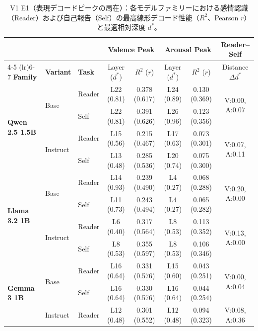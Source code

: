 \begin{table}[htbp]
\centering
\small
\caption{V1 E1（表現デコードピークの局在）：各モデルファミリーにおける感情認識（Reader）および自己報告（Self）の最高線形デコード性能（$R^2$、Pearson $r$）と最適相対深度 $d^*$。}
\label{tab:v1_peak_decodability}
\begin{tabular}{lll cccc c}
\toprule
 & & & \multicolumn{2}{c}{\textbf{Valence Peak}} & \multicolumn{2}{c}{\textbf{Arousal Peak}} & \textbf{Reader--Self} \\
\cmidrule(lr){4-5} \cmidrule(lr){6-7}
\textbf{Family} & \textbf{Variant} & \textbf{Task} & Layer ($d^*$) & $R^2$ ($r$) & Layer ($d^*$) & $R^2$ ($r$) & Distance $\Delta d^*$ \\
\midrule
\multirow{4}{*}{\textbf{Qwen 2.5 1.5B}} & \multirow{2}{*}{Base} & Reader & L22 (0.81) & 0.378 (0.617) & L24 (0.89) & 0.130 (0.369) & \multirow{2}{*}{V:0.00, A:0.07} \\
                                 &  & Self   & L22 (0.81) & 0.391 (0.626) & L26 (0.96) & 0.123 (0.356) &  \\
\cmidrule(lr){2-8}
                                 & \multirow{2}{*}{Instruct} & Reader & L15 (0.56) & 0.215 (0.467) & L17 (0.63) & 0.073 (0.301) & \multirow{2}{*}{V:0.07, A:0.11} \\
                                 &  & Self   & L13 (0.48) & 0.285 (0.536) & L20 (0.74) & 0.075 (0.300) &  \\
\midrule
\multirow{4}{*}{\textbf{Llama 3.2 1B}} & \multirow{2}{*}{Base} & Reader & L14 (0.93) & 0.239 (0.490) & L4 (0.27) & 0.068 (0.288) & \multirow{2}{*}{V:0.20, A:0.00} \\
                                 &  & Self   & L11 (0.73) & 0.243 (0.494) & L4 (0.27) & 0.065 (0.282) &  \\
\cmidrule(lr){2-8}
                                 & \multirow{2}{*}{Instruct} & Reader & L6 (0.40) & 0.317 (0.564) & L8 (0.53) & 0.113 (0.352) & \multirow{2}{*}{V:0.13, A:0.00} \\
                                 &  & Self   & L8 (0.53) & 0.355 (0.597) & L8 (0.53) & 0.106 (0.346) &  \\
\midrule
\multirow{4}{*}{\textbf{Gemma 3 1B}} & \multirow{2}{*}{Base} & Reader & L16 (0.64) & 0.331 (0.576) & L15 (0.60) & 0.043 (0.251) & \multirow{2}{*}{V:0.00, A:0.04} \\
                                 &  & Self   & L16 (0.64) & 0.330 (0.576) & L16 (0.64) & 0.044 (0.254) &  \\
\cmidrule(lr){2-8}
                                 & \multirow{2}{*}{Instruct} & Reader & L12 (0.48) & 0.301 (0.552) & L12 (0.48) & 0.094 (0.323) & \multirow{2}{*}{V:0.08, A:0.36} \\

\end{tabular}
\end{table}
